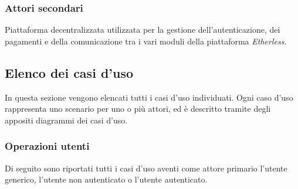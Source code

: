 	\subsubsection{Attori secondari}
		\begin{description}[style=nextline]
			\item[\textbf{Ethereum network}]
				Piattaforma decentralizzata utilizzata per la gestione dell'autenticazione, dei pagamenti e della comunicazione tra i vari moduli della piattaforma \textit{Etherless}. 
		\end{description}
	\pagebreak
\subsection{Elenco dei casi d'uso}
In questa sezione vengono elencati tutti i casi d'uso individuati. Ogni caso d'uso rappresenta uno scenario per uno o più attori, ed è descritto tramite degli appositi diagrammi dei casi d'uso. 

\subsubsection*{Operazioni utenti}
Di seguito sono riportati tutti i casi d'uso aventi come attore primario l'utente generico, l'utente non autenticato o l'utente autenticato. 

